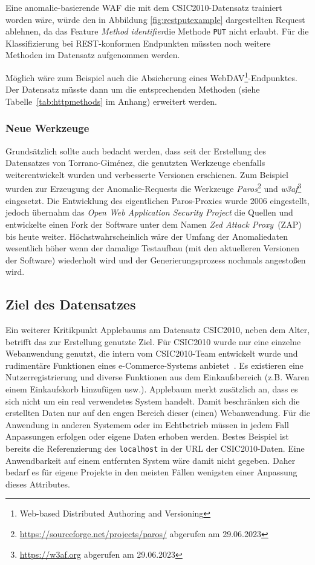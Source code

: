 Eine anomalie-basierende WAF die mit dem CSIC2010-Datensatz trainiert worden wäre, würde den in Abbildung \ref{fig:restputexample} dargestellten Request ablehnen, da das Feature \glqq\emph{Method identifier}\grqq die Methode \verb=PUT= nicht erlaubt. Für die Klassifizierung bei REST-konformen Endpunkten müssten noch weitere Methoden im Datensatz aufgenommen werden.

Möglich wäre zum Beispiel auch die Absicherung eines WebDAV\footnote{Web-based Distributed Authoring and Versioning}-Endpunktes. Der Datensatz müsste dann um die entsprechenden Methoden (siehe Tabelle~\ref{tab:httpmethods} im Anhang) erweitert werden.

\subsubsection{Neue Werkzeuge}
\label{sec:neuewerkzeuge}

Grundsätzlich sollte auch bedacht werden, dass seit der Erstellung des Datensatzes von Torrano-Giménez, die genutzten Werkzeuge ebenfalls weiterentwickelt wurden und verbesserte Versionen erschienen. Zum Beispiel wurden zur Erzeugung der Anomalie-Requests die Werkzeuge \emph{Paros}\footnote{\url{https://sourceforge.net/projects/paros/} abgerufen am 29.06.2023} und \emph{w3af}\footnote{\url{https://w3af.org} abgerufen am 29.06.2023} eingesetzt. Die Entwicklung des eigentlichen Paros-Proxies wurde 2006 eingestellt, jedoch übernahm das \emph{Open Web Application Security Project} die Quellen und entwickelte einen Fork der Software unter dem Namen \emph{Zed Attack Proxy}~(ZAP) bis heute weiter. Höchstwahrscheinlich wäre der Umfang der Anomaliedaten wesentlich höher wenn der damalige Testaufbau (mit den aktuelleren Versionen der Software) wiederholt wird und der Generierungsprozess nochmals angestoßen wird.
  
\subsection{Ziel des Datensatzes}
\label{sec:zieldesdatensatzes}

Ein weiterer Kritikpunkt Applebaums am Datensatz CSIC2010, neben dem Alter, betrifft das zur Erstellung genutzte Ziel. Für CSIC2010 wurde nur eine einzelne Webanwendung genutzt, die intern vom CSIC2010-Team entwickelt wurde und rudimentäre Funktionen eines e-Commerce-Systems anbietet~\cite{csic2010}. Es existieren eine Nutzerregistrierung und diverse Funktionen aus dem Einkaufsbereich (z.B. Waren einem Einkaufskorb hinzufügen usw.). Applebaum merkt zusätzlich an, dass es sich nicht um ein real verwendetes System handelt. Damit beschränken sich die erstellten Daten nur auf den engen Bereich dieser (einen) Webanwendung. Für die Anwendung in anderen Systemem oder im Echtbetrieb müssen in jedem Fall Anpassungen erfolgen oder eigene Daten erhoben werden. Bestes Beispiel ist bereits die Referenzierung des \verb=localhost= in der URL der CSIC2010-Daten. Eine Anwendbarkeit auf einem entfernten System wäre damit nicht gegeben. Daher bedarf es für eigene Projekte in den meisten Fällen wenigsten einer Anpassung dieses Attributes. 

